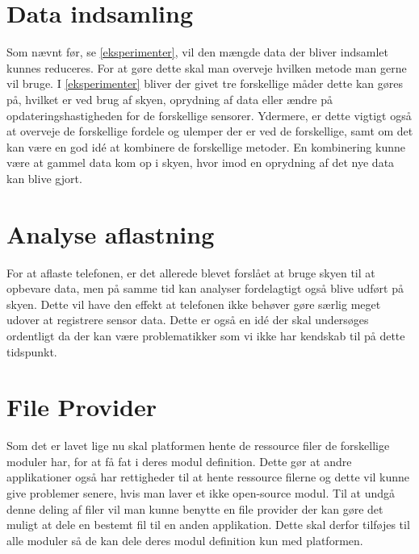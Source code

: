 \section{Data indsamling}
Som nævnt før, se \cref{eksperimenter}, vil den mængde data der bliver indsamlet kunnes reduceres.
For at gøre dette skal man overveje hvilken metode man gerne vil bruge.
I \cref{eksperimenter} bliver der givet tre forskellige måder dette kan gøres på, hvilket er ved brug af skyen, oprydning af data eller ændre på opdateringshastigheden for de forskellige sensorer.
Ydermere, er dette vigtigt også at overveje de forskellige fordele og ulemper der er ved de forskellige, samt om det kan være en god idé at kombinere de forskellige metoder.
En kombinering kunne være at gammel data kom op i skyen, hvor imod en oprydning af det nye data kan blive gjort.

\section{Analyse aflastning}
For at aflaste telefonen, er det allerede blevet forslået at bruge skyen til at opbevare data, men på samme tid kan analyser fordelagtigt også blive udført på skyen. 
Dette vil have den effekt at telefonen ikke behøver gøre særlig meget udover at registrere sensor data.
Dette er også en idé der skal undersøges ordentligt da der kan være problematikker som vi ikke har kendskab til på dette tidspunkt. 

\section{File Provider}
Som det er lavet lige nu skal platformen hente de ressource filer de forskellige moduler har, for at få fat i deres modul definition.
Dette gør at andre applikationer også har rettigheder til at hente ressource filerne og dette vil kunne give problemer senere, hvis man laver et ikke open-source modul.
Til at undgå denne deling af filer vil man kunne benytte en file provider der kan gøre det muligt at dele en bestemt fil til en anden applikation.
Dette skal derfor tilføjes til alle moduler så de kan dele deres modul definition kun med platformen. 

